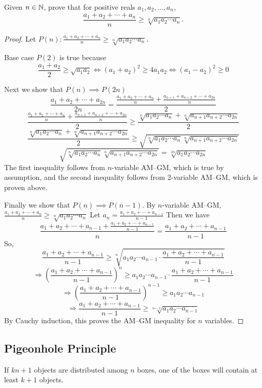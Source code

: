\begin{example}[AM--GM inequality]
Given $n\in\mathbb N$, prove that for positive reals $a_1,a_2,\dots,a_n$,
\[\frac{a_1+a_2+\cdots+a_n}{n}\ge\sqrt[n]{a_1a_2\cdots a_n}.\]

\begin{proof}
Let $\displaystyle P(n):\frac{a_1+a_2+\cdots+a_n}{n}\ge\sqrt[n]{a_1a_2\cdots a_n}$.

Base case $P(2)$ is true because\[\frac{a_1+a_2}{2}\ge\sqrt{a_1a_2} \iff (a_1+a_2)^2\ge 4a_1a_2 \iff (a_1-a_2)^2\ge0\]

Next we show that $P(n)\implies P(2n)$
\[\frac{a_1+a_2+\cdots+a_{2n}}{2n}=\frac{\frac{a_1+a_2+\cdots+a_n}{n}+\frac{a_{n+1}+a_{n+2}+\cdots+a_{2n}}{n}}{2}\]\[\frac{\frac{a_1+a_2+\cdots+a_n}{n}+\frac{a_{n+1}+a_{n+2}+\cdots+a_{2n}}{n}}{2}\ge\frac{\sqrt[n]{a_1a_2\cdots a_n}+\sqrt[n]{a_{n+1}a_{n+2}\cdots a_{2n}}}{2}\]\[\frac{\sqrt[n]{a_1a_2\cdots a_n}+\sqrt[n]{a_{n+1}a_{n+2}\cdots a_{2n}}}{2}\ge\sqrt{\sqrt[n]{a_1a_2\cdots a_n}\sqrt[n]{a_{n+1}a_{n+2}\cdots a_{2n}}}\]\[\sqrt{\sqrt[n]{a_1a_2\cdots a_n}\sqrt[n]{a_{n+1}a_{n+2}\cdots a_{2n}}}=\sqrt[2n]{a_1a_2\cdots a_{2n}}\]
The first inequality follows from $n$-variable AM--GM, which is true by assumption, and the second inequality follows from 2-variable AM--GM, which is proven above.

Finally we show that $P(n)\implies P(n-1)$. By $n$-variable AM--GM, $\frac{a_1+a_2+\cdots+a_n}{n}\ge\sqrt[n]{a_1a_2\cdots a_n}$ Let $a_n=\frac{a_1+a_2+\cdots+a_{n-1}}{n-1}$ Then we have\[\frac{a_1+a_2+\cdots+a_{n-1}+\frac{a_1+a_2+\cdots+a_{n-1}}{n-1}}{n}=\frac{a_1+a_2+\cdots+a_{n-1}}{n-1}\]So,\[\frac{a_1+a_2+\cdots+a_{n-1}}{n-1}\ge\sqrt[n]{a_1a_2\cdots a_{n-1}\cdot \frac{a_1+a_2+\cdots+a_{n-1}}{n-1}}\]\[\Rightarrow\left(\frac{a_1+a_2+\cdots+a_{n-1}}{n-1}\right)^n\ge a_1a_2\cdots a_{n-1}\cdot \frac{a_1+a_2+\cdots+a_{n-1}}{n-1}\]\[\Rightarrow\left(\frac{a_1+a_2+\cdots+a_{n-1}}{n-1}\right)^{n-1}\ge a_1a_2\cdots a_{n-1}\]\[\Rightarrow \frac{a_1+a_2+\cdots+a_{n-1}}{n-1}\ge\sqrt[n-1]{a_1a_2\cdots a_{n-1}}\]
By Cauchy induction, this proves the AM--GM inequality for $n$ variables.
\end{proof}
\end{example}

\subsection{Pigeonhole Principle}
\begin{theorem}
If $kn+1$ objects are distributed among $n$ boxes, one of the boxes will contain at least $k+1$ objects.
\end{theorem}

